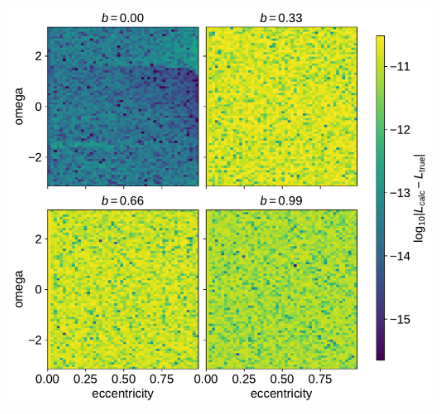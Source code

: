 \documentclass[modern]{aastex62}
\begin{document}
\begin{figure}[htbp]
\begin{centering}
\includegraphics[width=0.8\linewidth]{figures/contact_points.pdf}
\end{centering}
\end{figure}

\newpage

\end{document}
